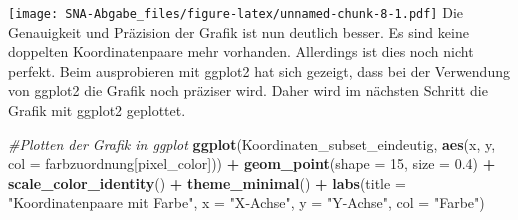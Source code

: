 \documentclass[
]{article}
\newenvironment{Shaded}{\begin{snugshade}}{\end{snugshade}}
\newcommand{\AttributeTok}[1]{\textcolor[rgb]{0.13,0.29,0.53}{#1}}
\newcommand{\CommentTok}[1]{\textcolor[rgb]{0.56,0.35,0.01}{\textit{#1}}}
\newcommand{\ConstantTok}[1]{\textcolor[rgb]{0.56,0.35,0.01}{#1}}
\newcommand{\DecValTok}[1]{\textcolor[rgb]{0.00,0.00,0.81}{#1}}
\newcommand{\FloatTok}[1]{\textcolor[rgb]{0.00,0.00,0.81}{#1}}
\newcommand{\FunctionTok}[1]{\textcolor[rgb]{0.13,0.29,0.53}{\textbf{#1}}}
\newcommand{\NormalTok}[1]{#1}
\newcommand{\OtherTok}[1]{\textcolor[rgb]{0.56,0.35,0.01}{#1}}
\newcommand{\SpecialCharTok}[1]{\textcolor[rgb]{0.81,0.36,0.00}{\textbf{#1}}}
\newcommand{\StringTok}[1]{\textcolor[rgb]{0.31,0.60,0.02}{#1}}
\begin{document}
\begin{Shaded}
\end{Shaded}

\texttt{[image: SNA-Abgabe\_files/figure-latex/unnamed-chunk-8-1.pdf]}
Die Genauigkeit und Präzision der Grafik ist nun deutlich besser. Es
sind keine doppelten Koordinatenpaare mehr vorhanden. Allerdings ist
dies noch nicht perfekt. Beim ausprobieren mit ggplot2 hat sich gezeigt,
dass bei der Verwendung von ggplot2 die Grafik noch präziser wird. Daher
wird im nächsten Schritt die Grafik mit ggplot2 geplottet.

\begin{Shaded}
\begin{Highlighting}[]
\CommentTok{\#Plotten der Grafik in ggplot}
\FunctionTok{ggplot}\NormalTok{(Koordinaten\_subset\_eindeutig, }\FunctionTok{aes}\NormalTok{(x, y, }\AttributeTok{col =}\NormalTok{ farbzuordnung[pixel\_color])) }\SpecialCharTok{+}
  \FunctionTok{geom\_point}\NormalTok{(}\AttributeTok{shape =} \DecValTok{15}\NormalTok{, }\AttributeTok{size =} \FloatTok{0.4}\NormalTok{) }\SpecialCharTok{+}
  \FunctionTok{scale\_color\_identity}\NormalTok{() }\SpecialCharTok{+}
  \FunctionTok{theme\_minimal}\NormalTok{() }\SpecialCharTok{+}
  \FunctionTok{labs}\NormalTok{(}\AttributeTok{title =} \StringTok{"Koordinatenpaare mit Farbe"}\NormalTok{, }\AttributeTok{x =} \StringTok{"X{-}Achse"}\NormalTok{, }\AttributeTok{y =} \StringTok{"Y{-}Achse"}\NormalTok{, }\AttributeTok{col =} \StringTok{"Farbe"}\NormalTok{)}
\end{Highlighting}
\end{Shaded}
\end{document}
